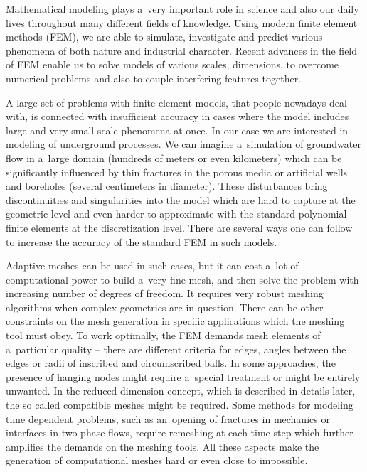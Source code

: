 Mathematical modeling plays a~very important role in science and also our daily lives throughout many different
fields of knowledge. Using modern finite element methods (FEM), we are able to simulate, investigate and predict
various phenomena of both nature and industrial character. Recent advances in the field of FEM
enable us to solve models of various scales, dimensions, to overcome numerical problems and also 
to couple interfering features together.

A large set of problems with finite element models, that people nowadays deal with, is connected with 
insufficient accuracy in cases where the model includes large and very small scale phenomena at once.
In our case we are interested in modeling of underground processes.
We can imagine a~simulation of groundwater flow in a~large domain (hundreds of meters or even kilometers) which can be significantly
influenced by thin fractures in the porous media or artificial wells and boreholes (several centimeters in diameter).
These disturbances bring discontinuities and singularities into the model which are hard to capture at the geometric level
and even harder to approximate with the standard polynomial finite elements at the discretization level.
There are several ways one can follow to increase the accuracy of the standard FEM in such models. 

Adaptive meshes can be used in such cases, but it can cost a~lot of computational power to build a~very fine mesh,
and then solve the problem with increasing number of degrees of freedom.
It requires very robust meshing algorithms when complex geometries are in question.
There can be other constraints on the mesh generation in specific applications which the meshing tool must obey.
To work optimally, the FEM demands mesh elements of a~particular quality -- there are different criteria
for edges, angles between the edges or radii of inscribed and circumscribed balls.
In some approaches, the presence of hanging nodes might require a~special treatment or might be entirely unwanted.
In the reduced dimension concept, which is described in details later, the so called compatible meshes might be required.
Some methods for modeling time dependent problems, such as an~opening of fractures in mechanics or interfaces in two-phase flows,
require remeshing at each time step which further amplifies the demands on the meshing tools.
All these aspects make the generation of computational meshes hard or even close to impossible.

